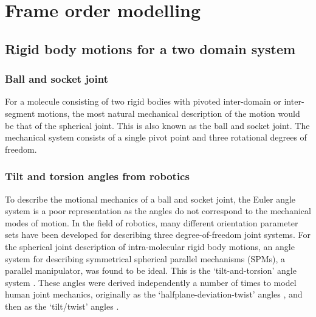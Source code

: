 
\section{Frame order modelling}
\label{sect: Frame order modelling}





\subsection{Rigid body motions for a two domain system}





\subsubsection{Ball and socket joint}

For a molecule consisting of two rigid bodies with pivoted inter-domain or inter-segment motions, the most natural mechanical description of the motion would be that of the spherical joint.
This is also known as the ball and socket joint.
The mechanical system consists of a single pivot point and three rotational degrees of freedom.




\subsubsection{Tilt and torsion angles from robotics}

To describe the motional mechanics of a ball and socket joint, the Euler angle system is a poor representation as the angles do not correspond to the mechanical modes of motion.
In the field of robotics, many different orientation parameter sets have been developed for describing three degree-of-freedom joint systems.
For the spherical joint description of intra-molecular rigid body motions, an angle system for describing symmetrical spherical parallel mechanisms (SPMs), a parallel manipulator, was found to be ideal.
This is the `tilt-and-torsion' angle system \citep{Huang99,BonevGosselin06}.
These angles were derived independently a number of times to model human joint mechanics, originally as the `halfplane-deviation-twist' angles \citep{Korein85}, and then as the `tilt/twist' angles \citep{Crawford99}.

